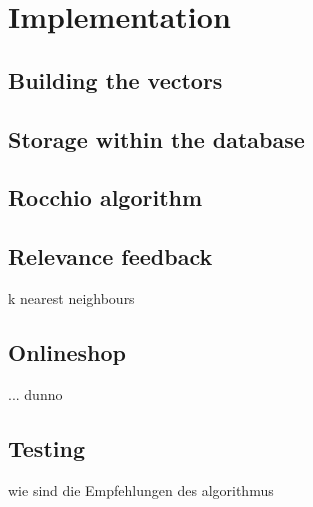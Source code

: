 

\section{Implementation}

\subsection{Building the vectors}

\subsection{Storage within the database}

\subsection{Rocchio algorithm}

\subsection{Relevance feedback}

k nearest neighbours

\subsection{Onlineshop}
... dunno

\subsection{Testing}
wie sind die Empfehlungen des algorithmus

